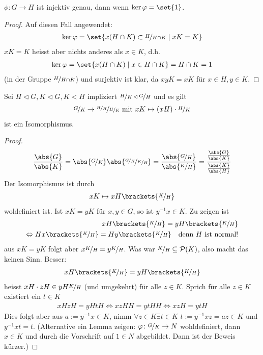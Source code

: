 \begin{lemma}
	$\phi: G \to H$ ist injektiv genau, dann wenn $\ker \phi = \set{1}$. 
\end{lemma}
\begin{proof}
	Auf diesen Fall angewendet:
	\begin{align*}
	\ker \phi = \set{x(H \cap K) \subset \lnkset{H}{H \cap K} \mid xK = K}
	\end{align*}
	$xK = K$ heisst aber nichts anderes als $x \in K$, d.h.
	\begin{align*}
	\ker \phi = \set{x(H \cap K) \mid x \in H \cap K} = H\cap K = 1
	\end{align*}
	(in der Gruppe $\lnkset{H}{H \cap K}$) und surjektiv ist klar, da $xyK = xK$ für $x \in H, y \in K$.
\end{proof}
\begin{proposition}[3. Isomorphiesatz]
	Sei $H \lhd G, K \lhd G, K < H$ impliziert $\lnkset{H}{K} \lhd \lnkset{G}{H}$ und es gilt
	\begin{align*}
		\lnkset{G}{K} \to \lnkset{\lnkset{H}{H}}{\lnkset{H}{K}} \mit xK \mapsto (xH)\cdot \lnkset{H}{K}
	\end{align*}
	ist ein Isomorphismus.
\end{proposition}
\begin{proof}
	\begin{align*}
		\frac{\abs{G}}{\abs{K}} = \abs{\lnkset{G}{K}} \abs{\lnkset{\lnkset{G}{H}}{\lnkset{K}{H}}} = \frac{\abs{\lnkset{G}{H}}}{\abs{\lnkset{K}{H}}} =  \frac{\frac{\abs{G}}{\abs{K}}}{\frac{\abs{K}}{\abs{H}}}
	\end{align*}
	Der Isomorphismus ist durch
	\begin{align*}
		xK \mapsto xH \brackets{\lnkset{K}{H}}
	\end{align*}
	woldefiniert ist. Ist $xK=yK$ für $x,y \in G$, so ist $y^{-1}x \in K$. Zu zeigen ist
	\begin{align*}
		xH\brackets{\lnkset{K}{H}} = yH\brackets{\lnkset{K}{H}}\\
		\Leftrightarrow Hx\brackets{\lnkset{K}{H}} = Hy\brackets{\lnkset{K}{H}} \quad\text{denn $H$ ist normal!}
	\end{align*}
	aus $xK=yK$ folgt aber $x \lnkset{K}{H} = y\lnkset{K}{H}$. Was war $\lnkset{K}{H} \subseteq \powerset(K)$, also macht das keinen Sinn. Besser: 
	\begin{align*}
		xH\brackets{\lnkset{K}{H}} = yH\brackets{\lnkset{K}{H}}
	\end{align*}
	heisst $xH \cdot zH \in yH\lnkset{K}{H}$ (und umgekehrt) für alle $z \in K$. Sprich für alle $z \in K$ existiert ein $t \in K$
	\begin{align*}
		xHzH = yHtH \Leftrightarrow xzHH = ytHH \Leftrightarrow xzH = ytH
	\end{align*}
	Dies folgt aber aus $a:= y^{-1}x \in K$, nimm $\forall z \in K \exists t \in K$ $t:= y^{-1}xz = az \in K$ und $y^{-1}xt = t$. (Alternative ein Lemma zeigen: $\phi\colon \lnkset{G}{K} \to N$ wohldefiniert, dann $x \in K$ und durch die Vorschrift auf $1 \in N$ abgebildet. Dann ist der Beweis kürzer.)
\end{proof}
